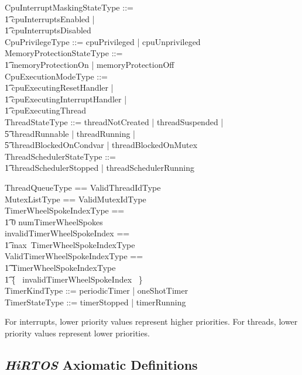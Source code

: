 \documentclass[11pt,letterpaper,twoside,openany]{book}
\begin{document}
\begin{zed}
    CpuInterruptMaskingStateType ::= \\
    \t1 cpuInterruptsEnabled | \\
    \t1 cpuInterruptsDisabled \\
    CpuPrivilegeType ::= cpuPrivileged | cpuUnprivileged \\
    MemoryProtectionStateType ::= \\
    \t1 memoryProtectionOn | memoryProtectionOff \\
    CpuExecutionModeType ::= \\
    \t1 cpuExecutingResetHandler | \\
    \t1 cpuExecutingInterruptHandler | \\
    \t1 cpuExecutingThread \\
    ThreadStateType ::= threadNotCreated | threadSuspended | \\
    \t5 threadRunnable | threadRunning | \\
    \t5 threadBlockedOnCondvar | threadBlockedOnMutex \\
    ThreadSchedulerStateType ::= \\
    \t1 threadSchedulerStopped | threadSchedulerRunning \\
\end{zed}

\begin{zed}
    ThreadQueueType == \iseq ValidThreadIdType \\
    MutexListType == \iseq ValidMutexIdType \\
    TimerWheelSpokeIndexType == \\
    \t1 0 \upto numTimerWheelSpokes \\
    invalidTimerWheelSpokeIndex == \\
    \t1 max~TimerWheelSpokeIndexType \\
    ValidTimerWheelSpokeIndexType == \\
    \t1 TimerWheelSpokeIndexType ~\setminus \\
    \t1 \{~ invalidTimerWheelSpokeIndex ~\} \\
    TimerKindType ::= periodicTimer | oneShotTimer \\
    TimerStateType ::= timerStopped | timerRunning \\
\end{zed}

For interrupts, lower priority values represent higher priorities. For threads, lower priority
values represent lower priorities.

\subsection{\emph{HiRTOS} Axiomatic Definitions}
\end{document}
